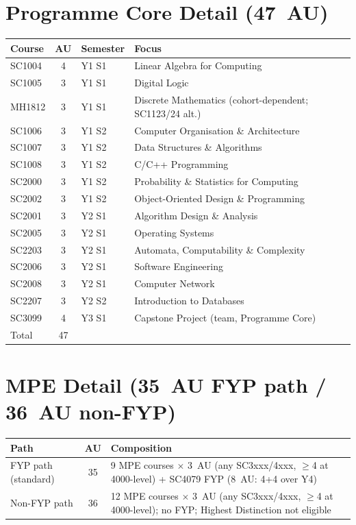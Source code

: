 \section{Programme Core Detail (47~AU)}
\label{sec:au-prog-detail}

\begin{table}[h]
\centering
\small
\renewcommand{\arraystretch}{1.22}
\begin{tabular}{@{}l c l p{4.2cm}@{}}
\toprule
Course & AU & Semester & Focus \\
\midrule
SC1004 & 4 & Y1 S1 & Linear Algebra for Computing \\
SC1005 & 3 & Y1 S1 & Digital Logic \\
MH1812 & 3 & Y1 S1 & Discrete Mathematics (cohort-dependent; SC1123/24 alt.) \\
SC1006 & 3 & Y1 S2 & Computer Organisation \& Architecture \\
SC1007 & 3 & Y1 S2 & Data Structures \& Algorithms \\
SC1008 & 3 & Y1 S2 & C/C++ Programming \\
SC2000 & 3 & Y1 S2 & Probability \& Statistics for Computing \\
SC2002 & 3 & Y1 S2 & Object-Oriented Design \& Programming \\
SC2001 & 3 & Y2 S1 & Algorithm Design \& Analysis \\
SC2005 & 3 & Y2 S1 & Operating Systems \\
SC2203 & 3 & Y2 S1 & Automata, Computability \& Complexity \\
SC2006 & 3 & Y2 S1 & Software Engineering \\
SC2008 & 3 & Y2 S1 & Computer Network \\
SC2207 & 3 & Y2 S2 & Introduction to Databases \\
SC3099 & 4 & Y3 S1 & Capstone Project (team, Programme Core) \\
\midrule
Total & 47 & & \\
\bottomrule
\end{tabular}
\end{table}

\section{MPE Detail (35~AU FYP path / 36~AU non-FYP)}
\label{sec:au-mpe-detail}

\begin{table}[h]
\centering
\small
\renewcommand{\arraystretch}{1.22}
\begin{tabular}{@{}p{5.0cm} c p{6.5cm}@{}}
\toprule
Path & AU & Composition \\
\midrule
FYP path (standard) & 35 & 9 MPE courses $\times$ 3~AU (any SC3xxx/4xxx, $\ge$4 at 4000-level) + SC4079 FYP (8~AU: 4+4 over Y4) \\
Non-FYP path & 36 & 12 MPE courses $\times$ 3~AU (any SC3xxx/4xxx, $\ge$4 at 4000-level); no FYP; Highest Distinction not eligible \\
\bottomrule
\end{tabular}
\end{table}

